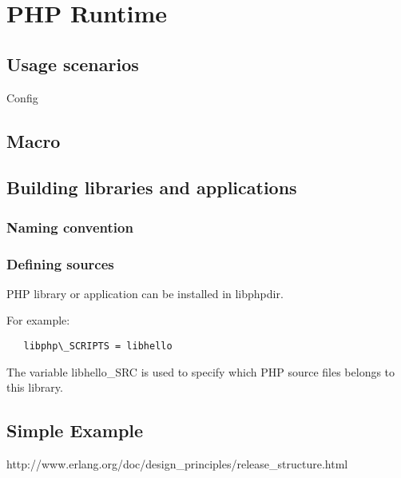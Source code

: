 \section{PHP Runtime}


\subsection{Usage scenarios}
Config

\subsection{Macro}


\subsection{Building libraries and applications}

\subsubsection{Naming convention}

\subsubsection{Defining sources}

PHP library or application can be installed in libphpdir.

For example:
\begin{verbatim}
   libphp\_SCRIPTS = libhello
\end{verbatim}

The variable libhello\_SRC is used to specify which PHP source files belongs to this library.



\subsection{Simple Example}


\begin{thebibliography}{}
http://www.erlang.org/doc/design\_principles/release\_structure.html
\end{thebibliography}